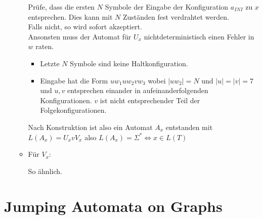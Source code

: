 \begin{beweis}
\begin{itemize}
\begin{itemize}
            Prüfe, dass die ersten $N$ Symbole der Eingabe der Konfiguration $a_{INI}$ zu $x$ entsprechen. Dies kann mit $N$ Zuständen fest verdrahtet werden.
            \\
            Falls nicht, so wird sofort akzeptiert.
            \\
            Ansonsten muss der Automat für $U_x$ nichtdeterministisch einen Fehler in $w$ raten.
            \begin{itemize}
                \item Letzte $N$ Symbole sind keine Haltkonfiguration.
                \item Eingabe hat die Form $u w_1 u w_2 v w_3$ wobei $|u w_2| = N$ und $|u| = |v| = 7$ und $u, v$ entsprechen einander in aufeinanderfolgenden Konfigurationen.
                $v$ ist nicht entsprechender Teil der Folgekonfigurationen.
            \end{itemize}



            Nach Konstruktion ist also ein Automat $A_x$ entstanden mit $L(A_x) = U_x v V_x$ also $L(A_x) = \Sigma^\ast \Leftrightarrow x \in L(T)$



            \item Für $V_x$:

            So ähnlich.


        \end{itemize}

    \end{itemize}

\end{beweis}











\section{Jumping Automata on Graphs}

